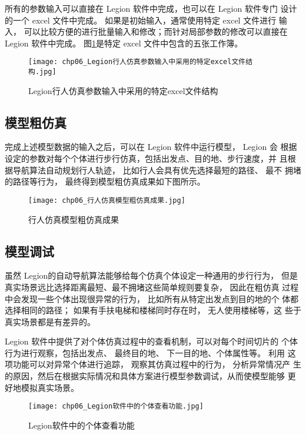所有的参数输入可以直接在 Legion 软件中完成，也可以在 Legion 软件专门
设计的一个 excel 文件中完成。 如果是初始输入，通常使用特定 excel 文件进行
输入， 可以比较方便的进行批量输入和修改；而针对局部参数的修改可以直接在
Legion 软件中完成。 图\ref{fig:Legion行人仿真参数输入中采用的特定excel文件结构}是特定 excel 文件中包含的五张工作簿。

\begin{figure}[!ht]
  \centering
  \texttt{[image: chp06\_Legion行人仿真参数输入中采用的特定excel文件结构.jpg]}
  \caption{Legion行人仿真参数输入中采用的特定excel文件结构\label{fig:Legion行人仿真参数输入中采用的特定excel文件结构} }
\end{figure}

\subsection{模型粗仿真}
完成上述模型数据的输入之后，可以在 Legion 软件中运行模型， Legion 会
根据设定的参数对每个个体进行步行仿真，包括出发点、目的地、步行速度，并
且根据导航算法自动规划行人轨迹， 比如行人会具有优先选择最短的路径、 最不
拥堵的路径等行为， 最终得到模型粗仿真成果如下图所示。

\begin{figure}[!ht]
  \centering
  \texttt{[image: chp06\_行人仿真模型粗仿真成果.jpg]}
  \caption{行人仿真模型粗仿真成果\label{fig:chp06_行人仿真模型粗仿真成果} }
\end{figure}

\subsection{模型调试}
虽然 Legion的自动导航算法能够给每个仿真个体设定一种通用的步行行为，
但是真实场景远比选择距离最短、最不拥堵这些简单规则要复杂， 因此在粗仿真
过程中会发现一些个体出现很异常的行为， 比如所有从特定出发点到目的地的个
体都选择相同的路径； 如果有手扶电梯和楼梯同时存在时， 无人使用楼梯等，这
些于真实场景都是有差异的。

Legion 软件中提供了对个体仿真过程中的查看机制，可以对每个时间切片的
个体行为进行观察，包括出发点、 最终目的地、 下一目的地、个体属性等。 利用
这项功能可以对异常个体进行追踪， 观察其仿真过程中的行为， 分析异常情况产
生的原因，然后在根据实际情况和具体方案进行模型参数调试，从而使模型能够
更好地模拟真实场景。

\begin{figure}[!ht]
  \centering
  \texttt{[image: chp06\_Legion软件中的个体查看功能.jpg]}
  \caption{Legion软件中的个体查看功能\label{fig:chp06_Legion软件中的个体查看功能} }
\end{figure}

